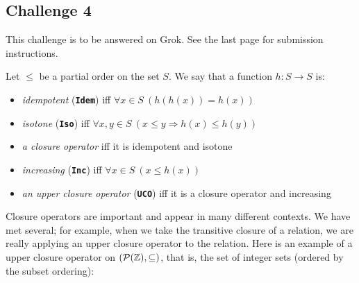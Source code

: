 \documentclass[12pt]{article}
\newcommand{\impl}{\mathbin{\Rightarrow}}
\newcommand{\intg}{\mathbb{Z}}
\begin{document}
\subsection*{Challenge 4}

This challenge is to be answered on Grok.
See the last page for submission instructions.

Let ${}\leq{}$ be a partial order on the set $S$.
We say that a function $h : S \rightarrow S$ is:
\begin{itemize}
\addtolength{\itemsep}{-6pt}
\item
\emph{idempotent} ({\bf \verb!Idem!})
iff $\forall x \in S\ (h(h(x)) = h(x))$
\item
\emph{isotone} ({\bf \verb!Iso!})
iff $\forall x,y \in S\ (x \leq y \impl h(x) \leq h(y))$
\item
\emph{a closure operator} iff it is idempotent and isotone
\item
\emph{increasing} ({\bf \verb!Inc!})
iff $\forall x \in S\ (x \leq h(x))$
\item
\emph{an upper closure operator} ({\bf \verb!UCO!})
iff it is a closure operator and increasing
\end{itemize}
Closure operators are important and appear in many different contexts.
We have met several; for example, when we take the transitive closure
of a relation, we are really applying an upper closure operator to the 
relation.
Here is an example of a upper closure operator on 
$({\cal P}(\intg),\subseteq)$, that is, the set of integer sets
(ordered by the subset ordering):
\end{document}
